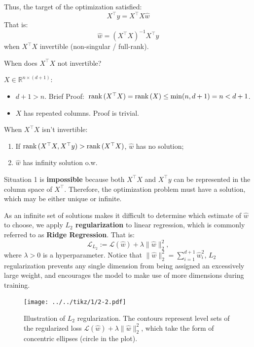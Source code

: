 \documentclass[../main]{subfiles}
\begin{document}
Thus, the target of the optimization satisfied:
\begin{equation}
    X^\top y=X^\top X\hat w
\end{equation}
That is:
\begin{equation}
    \hat w=(X^\top X)^{-1}X^\top y
\end{equation}
when $X^\top X$ invertible (non-singular / full-rank).
\begin{example}
  When does $X^\top X$ not invertible?
\end{example}
\begin{solution}
  $X\in \mathbb R^{n\times(d+1)}$:
\begin{itemize}
  \item $d+1>n.$ Brief Proof: $\, {\mathrm{rank}\,} (X^\top X)={\mathrm{rank}\,} (X)\le\min(n,d+1)=n<d+1$.
  \item $X$ has repeated columns. Proof is trivial.
\end{itemize}
\end{solution}

\vspace{1em}
When $X^\top X$ isn't invertible:
\begin{enumerate}
  \item If ${\mathrm{rank}\,} (X^\top X, X^\top y)>{\mathrm{rank}\,} (X^\top X)$, $\hat w$ has no solution; 
  \item $\hat w$ has infinity solution o.w.
\end{enumerate}
Situation 1 is \textbf{impossible} because both $X^\top X$ and $X^\top y$ can be represented in the column space of $X^\top$. Therefore, the optimization problem must have a solution, which may be either unique or infinite.

As an infinite set of solutions makes it difficult to determine which estimate of $\hat w$ to choose, we apply \textbf{$L_2$ regularization} to linear regression, which is commonly referred to as \textbf{Ridge Regression}. That is:
\begin{equation}
    \mathcal L_{L_2}:=\mathcal L(\hat w)+\boxed{\lambda\|\hat w\|_2^2},
\end{equation}
where $\lambda>0$ is a hyperparameter.
Notice that $\|\hat w\|_2^2=\sum_{i=1}^{d+1}\hat w_i^2$, $L_2$ regularization prevents any single dimension from being assigned an excessively large weight, and encourages the model to make use of more dimensions during training.
\begin{figure}[H]
  \centering
  \texttt{[image: ../../tikz/1/2-2.pdf]}
  \caption{Illustration of $L_2$ regularization. 
The contours represent level sets of the regularized loss $\mathcal{L}(\hat w) + \lambda \|\hat w\|_2^2$, 
which take the form of concentric ellipses (circle in the plot). }
\end{figure}
\end{document}
